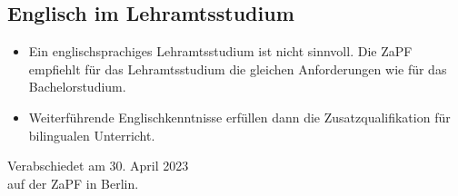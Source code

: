\documentclass[DIV=calc]{scrartcl}
\begin{document}
\subsection*{Englisch im Lehramtsstudium}
\begin{itemize}
    \item Ein englischsprachiges Lehramtsstudium ist nicht sinnvoll. Die ZaPF empfiehlt für das Lehramtsstudium die gleichen Anforderungen wie für das Bachelorstudium.
    \item Weiterführende Englischkenntnisse erfüllen dann die Zusatzqualifikation für bilingualen Unterricht.
\end{itemize}

\vspace{1cm} 

\vfill
\begin{flushright}
	Verabschiedet am 30. April 2023 \\
	auf der ZaPF in Berlin.
\end{flushright}
\end{document}
